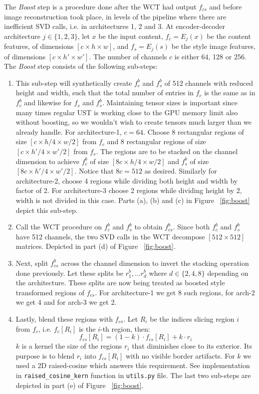 The \textit{Boost} step is a procedure done after the WCT had output $f_{cs}$ and before image reconstruction took place, in levels of the pipeline where there are inefficient SVD calls, i.e. in architectures 1, 2 and 3. At encoder-decoder architecture $j\in\{1,2,3\}$, let $x$ be the input content, $f_c = E_j(x)$ be the content features, of dimensions $[c \times h \times w]$, and $f_s = E_j(s)$ be the style image features, of dimensions $[c \times h' \times w']$. The number of channels $c$ is either 64, 128 or 256. The \textit{Boost} step consists of the following sub-steps:
\begin{enumerate}
	\item This sub-step will synthetically create $f_c^b$ and $f_s^b$ of 512 channels with reduced height and width, such that the total number of entries in $f_c$ is the same as in $f_c^b$ and likewise for $f_s$ and $f_s^b$. Maintaining tensor sizes is important since many times regular UST is working close to the GPU memory limit also without boosting, so we wouldn't wish to create tensors much larger than we already handle. For architecture-1, $c=64$. Choose 8 rectangular regions of size $[c \times h/4 \times w/2]$ from $f_c$ and 8 rectangular regions of size $[c \times h'/4 \times w'/2]$ from $f_s$. The regions are to be stacked on the channel dimension to achieve $f_c^b$ of size $[8c \times h/4 \times w/2]$ and $f_s^b$ of size $[8c \times h'/4 \times w'/2]$. Notice that $8c=512$ as desired. Similarly for architecture-2, choose 4 regions while dividing both height and width by factor of 2. For architecture-3 choose 2 regions while dividing height by 2, width is not divided in this case. Parts (a), (b) and (c) in Figure ~\ref{fig:boost} depict this sub-step. 
	
	\item Call the WCT procedure on $f_c^b$ and $f_s^b$ to obtain $f_{cs}^b$. Since both $f_c^b$ and $f_s^b$ have 512 channels, the two SVD calls in the WCT decompose $[512\times 512]$ matrices. Depicted in part (d) of Figure ~\ref{fig:boost}.
	
	\item Next, split $f_{cs}^b$ across the channel dimension to invert the stacking operation done previously. Let these splits be $r_1^b, \dots r_d^b$ where $d\in\{2,4,8\}$ depending on the architecture. These splits are now being treated as boosted style transformed regions of $f_{cs}$. For architecture-1 we get 8 such regions, for arch-2 we get 4 and for arch-3 we get 2.
	
	\item Lastly, blend these regions with $f_{cs}$. Let $R_i$ be the indices slicing region $i$ from $f_c$, i.e. $f_c[R_i]$ is the $i$-th region, then:
	\begin{equation}
	f_{cs}[R_i] = (1-k)\cdot f_{cs}[R_i] + k\cdot r_i
	\end{equation}
	$k$ is a kernel the size of the regions $r_i$ that diminishes close to its exterior. Its purpose is to blend $r_i$ into $f_{cs}[R_i]$ with no visible border artifacts. For $k$ we used a 2D raised-cosine which answers this requirement. See implementation in \texttt{raised\_cosine\_kern} function in \texttt{utils.py} file. The last two sub-steps are depicted in part (e) of Figure ~\ref{fig:boost}.
\end{enumerate}
